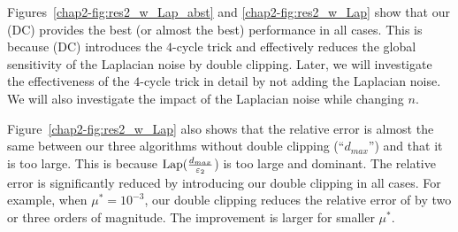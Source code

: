 Figures~\ref{chap2-fig:res2_w_Lap_abst} and \ref{chap2-fig:res2_w_Lap} show that our \AlgTwo{} (DC) 
provides the best (or almost the best) performance in all cases. 
This is because \AlgTwo{} (DC) introduces the $4$-cycle trick 
and effectively reduces the global sensitivity of the Laplacian noise by double clipping. 
Later, we will 
investigate 
the effectiveness of the $4$-cycle trick in detail 
by not adding the Laplacian noise. 
We will also investigate 
the impact of the Laplacian noise 
while changing $n$. 

Figure~\ref{chap2-fig:res2_w_Lap} also shows that 
the relative error is almost the same between our three algorithms without double clipping (``$d_{max}$'') and that it is too large. 
This is because $\textrm{Lap}(\frac{d_{max}}{\varepsilon_2}$) is too large and dominant. 
The relative error is significantly reduced by introducing our double clipping in all cases. 
For example, when $\mu^* = 10^{-3}$, our double clipping reduces the relative error of \AlgTwo{} by two or three orders of magnitude. 
The improvement is larger for smaller $\mu^*$. 

